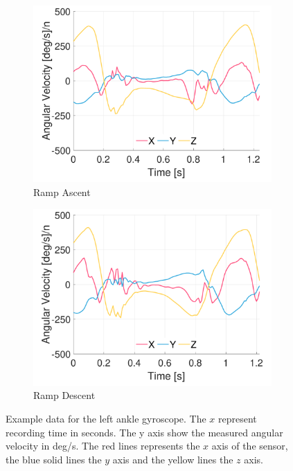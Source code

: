\begin{figure}[p]
    \begin{subfigure}[b]{0.49\textwidth}
         \centering
         \includegraphics[width=\textwidth]{content/3-Methods/example-data/ch3_example_data_subject_01_l_ankle_gyro_activity_ramp_up.pdf}
         \caption{Ramp Ascent}
    \end{subfigure}
    \begin{subfigure}[b]{0.49\textwidth}
         \centering
         \includegraphics[width=\textwidth]{content/3-Methods/example-data/ch3_example_data_subject_01_l_ankle_gyro_activity_ramp_down.pdf}
         \caption{Ramp Descent}
    \end{subfigure}
    \caption[Example left ankle gyroscope data]{Example data for the left ankle gyroscope. The $x$ represent recording time in seconds. The y axis show the measured angular velocity in deg/s. The red lines represents the $x$ axis of the sensor, the blue solid lines the $y$ axis and the yellow lines the $z$ axis.}
    \label{fig:example-left-ankle-gyro-sensor-data}
\end{figure}

